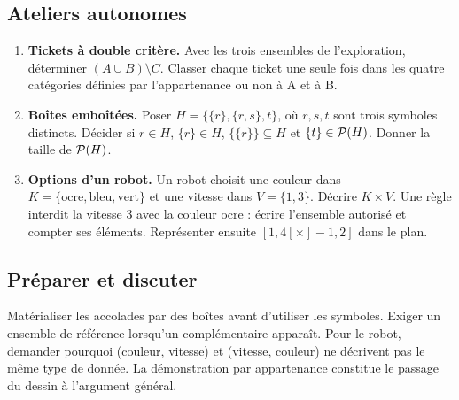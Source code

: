 \subsection{Ateliers autonomes}
\begin{enumerate}
\item \textbf{Tickets à double critère.} Avec les trois ensembles de l'exploration, déterminer $(A\cup B)\setminus C$. Classer chaque ticket une seule fois dans les quatre catégories définies par l'appartenance ou non à A et à B.
\item \textbf{Boîtes emboîtées.} Poser $H=\{\{r\},\{r,s\},t\}$, où $r,s,t$ sont trois symboles distincts. Décider si $r\in H$, $\{r\}\in H$, $\{\{r\}\}\subseteq H$ et $\{t\}\in\mathcal{P}(H)$. Donner la taille de $\mathcal{P}(H)$.
\item \textbf{Options d'un robot.} Un robot choisit une couleur dans $K=\{\text{ocre},\text{bleu},\text{vert}\}$ et une vitesse dans $V=\{1,3\}$. Décrire $K\times V$. Une règle interdit la vitesse 3 avec la couleur ocre : écrire l'ensemble autorisé et compter ses éléments. Représenter ensuite $[1,4[\times]-1,2]$ dans le plan.
\end{enumerate}
\ifprof
\subsection{Préparer et discuter}
Matérialiser les accolades par des boîtes avant d'utiliser les symboles. Exiger un ensemble de référence lorsqu'un complémentaire apparaît. Pour le robot, demander pourquoi (couleur, vitesse) et (vitesse, couleur) ne décrivent pas le même type de donnée. La démonstration par appartenance constitue le passage du dessin à l'argument général.

\fi
